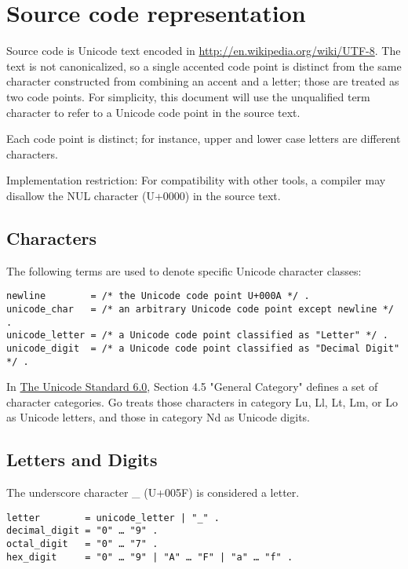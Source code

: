 \documentclass[UTF8]{article}
\begin{document}
\section*{Source code representation}
Source code is Unicode text encoded in
\hyperref[UTF-8]{http://en.wikipedia.org/wiki/UTF-8}. The text is
not canonicalized, so a single accented code point is distinct from
the same character constructed from combining an accent and a letter;
those are treated as two code points. For simplicity, this document
will use the unqualified term character to refer to a Unicode code
point in the source text.

Each code point is distinct; for instance, upper and lower case
letters are different characters.

Implementation restriction: For compatibility with other tools, a
compiler may disallow the NUL character (U+0000) in the source text.

\subsection*{Characters}
The following terms are used to denote specific Unicode character
classes:

\begin{Verbatim}[frame=single]
newline        = /* the Unicode code point U+000A */ .
unicode_char   = /* an arbitrary Unicode code point except newline */ .
unicode_letter = /* a Unicode code point classified as "Letter" */ .
unicode_digit  = /* a Unicode code point classified as "Decimal Digit" */ .
\end{Verbatim}

In \href{http://www.unicode.org/versions/Unicode6.0.0/}{The Unicode Standard 6.0},
Section 4.5 "General Category" defines a set of character categories.
Go treats those characters in category Lu, Ll, Lt, Lm, or Lo as
Unicode letters, and those in category Nd as Unicode digits.

\subsection*{Letters and Digits}
The underscore character \_ (U+005F) is considered a letter.

\begin{Verbatim}[frame=single]
letter        = unicode_letter | "_" .
decimal_digit = "0" … "9" .
octal_digit   = "0" … "7" .
hex_digit     = "0" … "9" | "A" … "F" | "a" … "f" .
\end{Verbatim}
\end{document}
